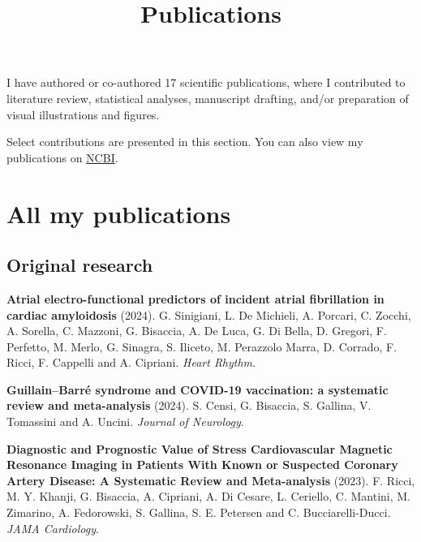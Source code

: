 \documentclass[
  letterpaper,
  DIV=11,
  numbers=noendperiod]{scrartcl}
\title{Publications}
\author{}
\date{}
\begin{document}
\maketitle

I have authored or co-authored 17 scientific publications, where I
contributed to literature review, statistical analyses, manuscript
drafting, and/or preparation of visual illustrations and figures.

Select contributions are presented in this section. You can also view my
publications on
\href{https://www.ncbi.nlm.nih.gov/myncbi/giandomenico.bisaccia.1/bibliography/public/}{NCBI}.

\section{}\label{section}

\label{mainpubs}

\section{All my publications}\label{all-my-publications}

\subsection{Original research}\label{original-research}

\textbf{Atrial electro-functional predictors of incident atrial
fibrillation in cardiac amyloidosis} (2024). G. Sinigiani, L. De
Michieli, A. Porcari, C. Zocchi, A. Sorella, C. Mazzoni, G. Bisaccia, A.
De Luca, G. Di Bella, D. Gregori, F. Perfetto, M. Merlo, G. Sinagra, S.
Iliceto, M. Perazzolo Marra, D. Corrado, F. Ricci, F. Cappelli and A.
Cipriani. \emph{Heart Rhythm}.
\href{https://doi.org/10.1016/j.hrthm.2024.01.056}{}

\textbf{Guillain--Barré syndrome and COVID-19 vaccination: a systematic
review and meta-analysis} (2024). S. Censi, G. Bisaccia, S. Gallina, V.
Tomassini and A. Uncini. \emph{Journal of Neurology}.
\href{https://doi.org/10.1007/s00415-024-12186-7}{}

\textbf{Diagnostic and Prognostic Value of Stress Cardiovascular
Magnetic Resonance Imaging in Patients With Known or Suspected Coronary
Artery Disease: A Systematic Review and Meta-analysis} (2023). F. Ricci,
M. Y. Khanji, G. Bisaccia, A. Cipriani, A. Di Cesare, L. Ceriello, C.
Mantini, M. Zimarino, A. Fedorowski, S. Gallina, S. E. Petersen and C.
Bucciarelli-Ducci. \emph{JAMA Cardiology}.
\href{https://doi.org/10.1001/jamacardio.2023.1290}{}
\end{document}
